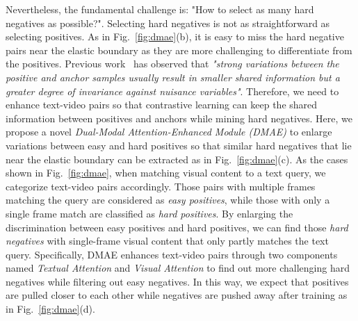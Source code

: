 \documentclass[sigconf]{acmart}
\begin{document}
Nevertheless, the fundamental challenge is: "How to select as many hard negatives as possible?". Selecting hard negatives is not as straightforward as selecting positives.
As in Fig.~\ref{fig:dmae}(b), it is easy to miss the hard negative pairs near the elastic boundary as they are more challenging to differentiate from the positives.
Previous work~\cite{tupleinfonce2021} has observed that \textit{"strong variations between the positive and anchor samples usually result in smaller shared information but a greater degree of invariance against nuisance variables"}.
Therefore, 
we need to enhance text-video pairs so that contrastive learning can keep the shared information between positives and anchors while mining hard negatives.
Here, we propose a novel \textit{Dual-Modal Attention-Enhanced Module (DMAE)} to enlarge variations between easy and hard positives so that similar hard negatives that lie near the elastic boundary can be extracted  as in Fig.~\ref{fig:dmae}(c).
As the cases shown in Fig.~\ref{fig:dmae}, 
when matching visual content to a text query, we categorize text-video pairs accordingly. Those pairs with multiple frames matching the query are considered as \textit{easy positives}, while those with only a single frame match are classified as \textit{hard positives}.
By enlarging the discrimination between easy positives and hard positives, we can find those \textit{hard negatives} with single-frame visual content that only partly matches the text query.
Specifically, DMAE enhances text-video pairs through two components named \textit{Textual Attention} and \textit{Visual Attention} to find out more challenging hard negatives while filtering out easy negatives. 
In this way, we expect that positives are pulled closer to each other while negatives are pushed away after training as in Fig.~\ref{fig:dmae}(d).
\end{document}

